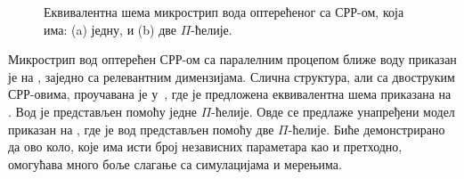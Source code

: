 \documentclass[main.tex]{subfiles}
\begin{document}
\begin{figure}[h]
\centering
{}\hspace{0.3cm}
\caption{Еквивалентна шема микрострип вода оптерећеног са СРР-ом, која има: (a) једну, и (b) две $\Pi$-ћелије.} 
\label{f2}
\end{figure}
Микрострип вод оптерећен СРР-ом са паралелним процепом ближе воду приказан је на , заједно са релевантним димензијама. Слична структура, али са двоструким СРР-овима, проучавана је у~\cite{bib16}, где је предложена еквивалентна шема приказана на . Вод је представљен помоћу једне $\Pi$-ћелије. Овде се предлаже унапређени модел приказан на , где је вод представљен помоћу две $\Pi$-ћелије. Биће демонстрирано да ово коло, које има исти број независних параметара као и претходно, омогућава много боље слагање са симулацијама и мерењима.
\end{document}
